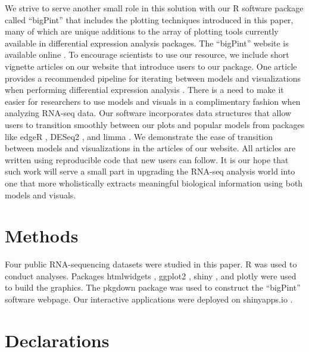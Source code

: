 \documentclass{bmcart}
\begin{document}
\begin{linenumbers}
\begin{doublespacing}
We strive to serve another small role in this solution with our \textsf{R} software package called ``bigPint'' that includes the plotting techniques introduced in this paper, many of which are unique additions to the array of plotting tools currently available in differential expression analysis packages. The ``bigPint'' website is available online \cite{bigPint}. To encourage scientists to use our resource, we include short vignette articles on our website that introduce users to our package. One article provides a recommended pipeline for iterating between models and visualizations when performing differential expression analysis \cite{bigPint2}. There is a need to make it easier for researchers to use models and visuals in a complimentary fashion when analyzing RNA-seq data. Our software incorporates data structures that allow users to transition smoothly between our plots and popular models from packages like edgeR \cite{Robinson}, DESeq2 \cite{Love}, and limma \cite{Ritchie}. We demonstrate the ease of transition between models and visualizations in the articles of our website. All articles are written using reproducible code that new users can follow. It is our hope that such work will serve a small part in upgrading the RNA-seq analysis world into one that more wholistically extracts meaningful biological information using both models and visuals.

\section*{Methods}

Four public RNA-sequencing datasets were studied in this paper. R \cite{R} was used to conduct analyses. Packages htmlwidgets \cite{htmlwidgets}, ggplot2 \cite{ggplot2}, shiny \cite{shiny}, and plotly \cite{plotly} were used to build the graphics. The pkgdown \cite{pkgdown} package was used to construct the ``bigPint'' software webpage. Our interactive applications were deployed on shinyapps.io \cite{rstudio}.

\end{doublespacing} %


\section*{Declarations}


\end{linenumbers}
\end{document}
